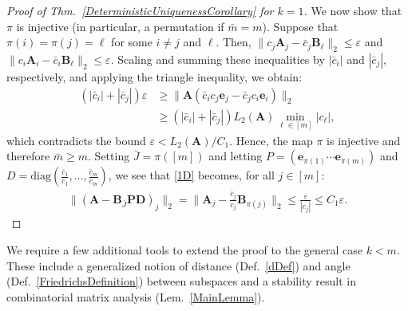 \documentclass[9pt,twocolumn]{pnas-new}
\newtheorem{remark}{Remark}
\begin{document}
\begin{proof}[Proof of Thm.~\ref{DeterministicUniquenessCorollary} for $k=1$]
We  now show that $\pi$ is injective (in particular, a permutation if $\bar m = m$). Suppose that $\pi(i) = \pi(j) = \ell$ for some $i \neq j$ and $\ell$. Then, $\|c_{j}\mathbf{A}_{j} - \bar{c}_{j}\mathbf{B}_{\ell}\|_2 \leq \varepsilon$ and $\|c_{i}\mathbf{A}_{i} - \bar{c}_{i} \mathbf{B}_{\ell}\|_2  \leq \varepsilon$. Scaling and summing these inequalities by $|\bar{c}_{i}|$ and $|\bar{c}_{j}|$, respectively, and applying the triangle inequality, we obtain:
\begin{align*}%
(|\bar{c}_{i}| + |\bar{c}_{j}|) \varepsilon
&\geq\|\mathbf{A}(\bar{c}_{i}c_{j} \mathbf{e}_{j} - \bar{c}_{j}c_{i}\mathbf{e}_{i})\|_2 \nonumber \\ 
&\geq  \left( |\bar{c}_{i}| + |\bar{c}_{j}| \right) L_2(\mathbf{A}) \min_{\ell \in [m]} |c_\ell |,
\end{align*}
%
which contradicts the bound $\varepsilon < L_2(\mathbf{A})/C_1$. Hence, the map $\pi$ is injective and therefore $\bar m \geq m$. Setting $\bar J = \pi([m])$ and letting $P = \left( \mathbf{e}_{\pi(1)} \cdots \mathbf{e}_{\pi(m)}\right)$ and $D = \text{diag}(\frac{\bar{c}_1}{c_1},\ldots,\frac{\bar{c}_m}{c_m})$, we see that \eqref{1D} becomes, for all $j \in [m]$:
\begin{align*}%
\|(\mathbf{A} - \mathbf{B}_{\bar J}\mathbf{PD})_j\|_2 
= \|\mathbf{A}_j - \frac{\bar{c}_j}{c_j}\mathbf{B}_{\pi(j)}\|_2 
\leq \frac{\varepsilon}{|c_j|} 
\leq C_1\varepsilon.
\end{align*}
\end{proof}



We require a few additional tools to extend the proof to the general case $k < m$. These include a generalized notion of distance (Def.~\ref{dDef}) and angle (Def.~\ref{FriedrichsDefinition}) between subspaces and a stability result in combinatorial matrix analysis (Lem.~\ref{MainLemma}).
\end{document}
